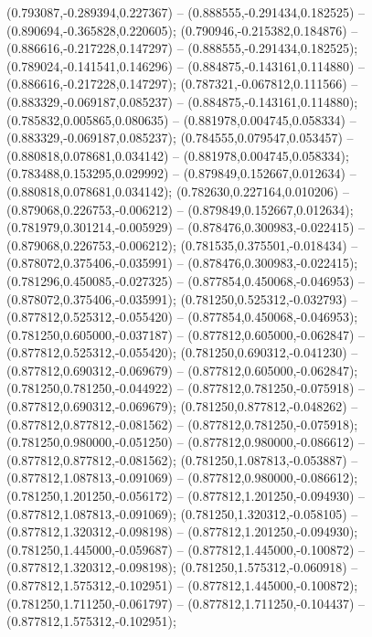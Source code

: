  (0.793087,-0.289394,0.227367) -- (0.888555,-0.291434,0.182525) -- (0.890694,-0.365828,0.220605);
 (0.790946,-0.215382,0.184876) -- (0.886616,-0.217228,0.147297) -- (0.888555,-0.291434,0.182525);
 (0.789024,-0.141541,0.146296) -- (0.884875,-0.143161,0.114880) -- (0.886616,-0.217228,0.147297);
 (0.787321,-0.067812,0.111566) -- (0.883329,-0.069187,0.085237) -- (0.884875,-0.143161,0.114880);
 (0.785832,0.005865,0.080635) -- (0.881978,0.004745,0.058334) -- (0.883329,-0.069187,0.085237);
 (0.784555,0.079547,0.053457) -- (0.880818,0.078681,0.034142) -- (0.881978,0.004745,0.058334);
 (0.783488,0.153295,0.029992) -- (0.879849,0.152667,0.012634) -- (0.880818,0.078681,0.034142);
 (0.782630,0.227164,0.010206) -- (0.879068,0.226753,-0.006212) -- (0.879849,0.152667,0.012634);
 (0.781979,0.301214,-0.005929) -- (0.878476,0.300983,-0.022415) -- (0.879068,0.226753,-0.006212);
 (0.781535,0.375501,-0.018434) -- (0.878072,0.375406,-0.035991) -- (0.878476,0.300983,-0.022415);
 (0.781296,0.450085,-0.027325) -- (0.877854,0.450068,-0.046953) -- (0.878072,0.375406,-0.035991);
 (0.781250,0.525312,-0.032793) -- (0.877812,0.525312,-0.055420) -- (0.877854,0.450068,-0.046953);
 (0.781250,0.605000,-0.037187) -- (0.877812,0.605000,-0.062847) -- (0.877812,0.525312,-0.055420);
 (0.781250,0.690312,-0.041230) -- (0.877812,0.690312,-0.069679) -- (0.877812,0.605000,-0.062847);
 (0.781250,0.781250,-0.044922) -- (0.877812,0.781250,-0.075918) -- (0.877812,0.690312,-0.069679);
 (0.781250,0.877812,-0.048262) -- (0.877812,0.877812,-0.081562) -- (0.877812,0.781250,-0.075918);
 (0.781250,0.980000,-0.051250) -- (0.877812,0.980000,-0.086612) -- (0.877812,0.877812,-0.081562);
 (0.781250,1.087813,-0.053887) -- (0.877812,1.087813,-0.091069) -- (0.877812,0.980000,-0.086612);
 (0.781250,1.201250,-0.056172) -- (0.877812,1.201250,-0.094930) -- (0.877812,1.087813,-0.091069);
 (0.781250,1.320312,-0.058105) -- (0.877812,1.320312,-0.098198) -- (0.877812,1.201250,-0.094930);
 (0.781250,1.445000,-0.059687) -- (0.877812,1.445000,-0.100872) -- (0.877812,1.320312,-0.098198);
 (0.781250,1.575312,-0.060918) -- (0.877812,1.575312,-0.102951) -- (0.877812,1.445000,-0.100872);
 (0.781250,1.711250,-0.061797) -- (0.877812,1.711250,-0.104437) -- (0.877812,1.575312,-0.102951);
